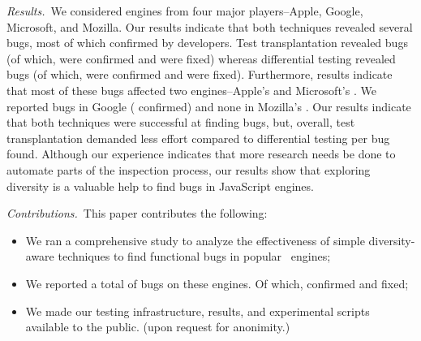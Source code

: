 \documentclass[10pt,conference,anonymous]{IEEEtran}
\begin{document}


\emph{Results.}~We considered engines from four major players--Apple,
Google, Microsoft, and Mozilla. Our results indicate that both
techniques revealed several bugs, most of which confirmed by
developers. Test transplantation revealed \noBugsTransplantation{}
bugs (of which, \noBugsTransplantationConfirmed{} were confirmed and
\noBugsTransplantationFixed{} were fixed) whereas differential testing
revealed \noBugsDifferentialTesting{} bugs (of which,
\noBugsDifferentialTestingConfirmed{} were confirmed and
\noBugsDifferentialTestingFixed{} were fixed). Furthermore, results
indicate that most of these bugs affected two engines--Apple's \jsc{}
and Microsoft's \chakra{}.  We reported \noBugsBugsReportedGoogle{}
bugs in Google \veight{} (\noBugsBugsConfirmedGoogle{} confirmed) and
none in Mozilla's \smonkey{}. Our results indicate that both
techniques were successful at finding bugs, but, overall, test
transplantation demanded less effort compared to differential testing
per bug found. Although our experience indicates that more research
needs be done to automate parts of the inspection process, our results
show that exploring diversity is a valuable help to find bugs in
JavaScript engines.


\emph{Contributions.}~This paper contributes the following:
\begin{itemize}
  \item We ran a comprehensive study to analyze the effectiveness of
    simple diversity-aware techniques to find functional bugs in
     popular \js\ engines;
    
  \item We reported a total of \totalBugsReported{} bugs on these
    engines. Of which, \totalBugsConfirmed{} confirmed and
    \totalBugsFixed{} fixed;
    
    
  \item We made our testing infrastructure, results, and experimental
    scripts available to the public. (upon request for anonimity.)

\end{itemize}
\end{document}

